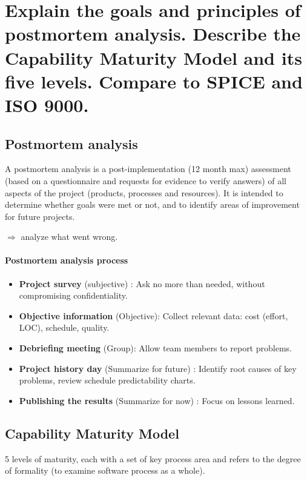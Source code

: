 \clearpage{}

\section{Explain the goals and principles of postmortem analysis. Describe
the Capability Maturity Model and its five levels. Compare to SPICE and ISO
9000.}

\subsection{Postmortem analysis}


A postmortem analysis is a post-implementation (12 month max) assessment
(based on a questionnaire and requests for evidence to verify answers) of all aspects of the
project (products, processes and resources). It is intended to determine whether
goals were met or not, and to identify areas of improvement for future projects.

$\Rightarrow$ analyze what went wrong.

\paragraph{Postmortem analysis process}

\begin{itemize}
    \item \textbf{Project survey} (subjective) : Ask no more than needed, without compromising confidentiality.
    \item \textbf{Objective information} (Objective): Collect relevant data: cost (effort, LOC), schedule, quality.
    \item \textbf{Debriefing meeting} (Group): Allow team members to report problems.
    \item \textbf{Project history day} (Summarize for future) : Identify root causes of key problems, review schedule predictability charts.
    \item \textbf{Publishing the results} (Summarize for now) : Focus on lessons learned.
\end{itemize}

\subsection{Capability Maturity Model}

5 levels of maturity, each with a set of key process area and refers to
the degree of formality (to examine software process as a whole).


